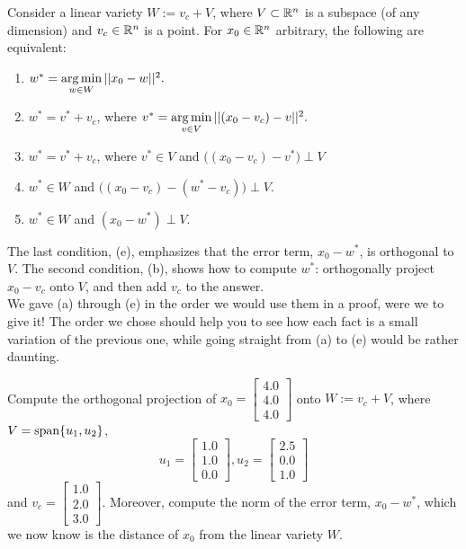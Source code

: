 \begin{tcolorbox}[title=\textbf{Small Extension of the Projection Theorem}]
 Consider a linear variety $W:=v_c + V$, where  $V\subset \mathbb R^n$ is a subspace (of any dimension) and $v_c \in \mathbb R^n$ is a point. For $x_0 \in \mathbb R^n$ arbitrary, the following are equivalent:
 \begin{enumerate}
 \renewcommand{\labelenumi}{(\alph{enumi})}
\setlength{\itemsep}{.2cm}
     \item $w^\ast = \operatorname*{arg\,min}\limits_{w \in W} ||x_0 -w||^2.$
     \item $w^\ast =v^\ast +v_c$, where $ v^\ast= \operatorname*{arg\,min}\limits_{v \in V} ||(x_0-v_c) - v||^2.$
       \item $w^\ast =v^\ast +v_c$, where $v^\ast \in V$ and $\big( (x_0 - v_c) - v^\ast \big) \perp V$ 
     \item  $w^\ast \in W$ and $\big( (x_0 - v_c) - (w^\ast-v_c) \big) \perp V$. 
     \item  $w^\ast \in W$ and $(x_0-w^\ast) \perp V$.
 \end{enumerate}
 The last condition, (e), emphasizes that the error term, $x_0-w^\ast$, is orthogonal to $V$. 
 The second condition, (b), shows how to compute $w^\ast$: orthogonally project $x_0-v_c$ onto $V$, and then add $v_c$ to the answer.\\
 
 We gave (a) through (e) in the order we would use them in a proof, were we to give it! The order we chose should help you to see how each fact is a small variation of the previous one, while going straight from (a) to (e) would be rather daunting.
\end{tcolorbox}



\begin{example}
\label{ex:exampleFrom445} Compute the orthogonal projection of $x_0 = \left[ \begin{array}{r} 4.0 \\ 4.0 \\ 4.0 \end{array} \right]$ onto $W := v_c + V$, where $V= \mathrm{span} \{ u_1, u_2 \}$, 
$$u_1=\left[ \begin{array}{r} 1.0 \\ 1.0 \\ 0.0 \end{array} \right], u_2=\left[ \begin{array}{r} 2.5 \\ 0.0 \\ 1.0 \end{array} \right] $$ 
and $v_c = \left[ \begin{array}{r} 1.0 \\ 2.0 \\ 3.0 \end{array} \right]$. Moreover, compute the norm of the error term, $x_0 - w^\ast$, which we now know is the distance of $x_0$ from the linear variety $W$.
\end{example}

